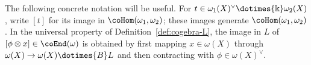 \begin{convention}\label{con:coend-bracket}
	The following concrete notation will be useful. For
	$t\in\omega_1(X)^\vee\dotimes{\Bbbk}\omega_2(X)$, write $[t]$ for its
	image in $\coHom(\omega_1,\omega_2)$; these images generate
	$\coHom(\omega_1,\omega_2)$. In the universal property of
	Definition~\ref{def:cogebra-L}, the image in $L$ of
	$[\phi\otimes x]\in\coEnd(\omega)$ is obtained by first mapping
	$x\in\omega(X)$ through $\omega(X)\to\omega(X)\dotimes{B}L$ and then
	contracting with $\phi\in\omega(X)^\vee$.
\end{convention}
